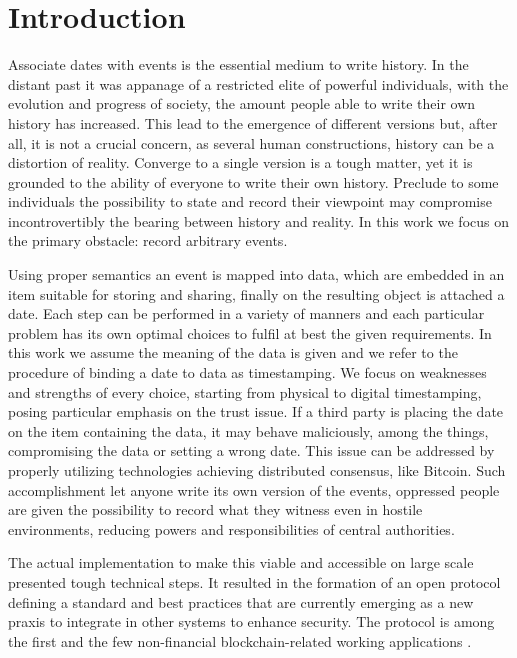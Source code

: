 \chapter{Introduction}
\label{chpr:intro}
Associate dates with events is the essential medium to write history. 
In the distant past it was appanage of a restricted elite of powerful individuals, with the evolution and progress of society, the amount people able to write their own history has increased.
This lead to the emergence of different versions but, after all, it is not a crucial concern, as several human constructions, history can be a distortion of reality.
Converge to a single version is a tough matter, yet it is grounded to the ability of everyone to write their own history.
Preclude to some individuals the possibility to state and record their viewpoint may compromise incontrovertibly the bearing between history and reality.
In this work we focus on the primary obstacle: record arbitrary events.

Using proper semantics an event is mapped into data, which are embedded in an item suitable for storing and sharing, finally on the resulting object is attached a date. 
Each step can be performed in a variety of manners and each particular problem has its own optimal choices to fulfil at best the given requirements. 
In this work we assume the meaning of the data is given and we refer to the procedure of binding a date to data as timestamping. 
We focus on weaknesses and strengths of every choice, starting from physical to digital timestamping, posing particular emphasis on the trust issue.
If a third party is placing the date on the item containing the data, it may behave maliciously, among the things, compromising the data or setting a wrong date. This issue can be addressed by properly utilizing technologies achieving distributed consensus, like Bitcoin.
Such accomplishment let anyone write its own version of the events, oppressed people are given the possibility to record what they witness even in hostile environments, reducing powers and responsibilities of central authorities.

The actual implementation to make this viable and accessible on large scale presented tough technical steps. 
It resulted in the formation of an open protocol defining a standard and best practices \cite{OTSWeb} that are currently emerging as a new praxis to integrate in other systems to enhance security. 
The protocol is among the first and the few non-financial blockchain-related working applications \cite{ESMAresponse}.

